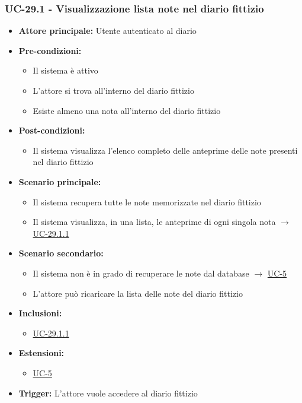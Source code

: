 \documentclass[a4paper,12pt]{article}
\begin{document}
\subsubsection{UC-29.1 - Visualizzazione lista note nel diario fittizio} \label{subsec:UC-29.1}
\begin{itemize}
    \item \textbf{Attore principale:} Utente autenticato al diario
    \item \textbf{Pre-condizioni:}
    \begin{itemize}
        \item Il sistema è attivo
        \item L'attore si trova all'interno del diario fittizio
        \item Esiste almeno una nota all'interno del diario fittizio
    \end{itemize}
    \item \textbf{Post-condizioni:} 
    \begin{itemize}
        \item Il sistema visualizza l'elenco completo delle anteprime delle note presenti nel diario fittizio
    \end{itemize}
    \item \textbf{Scenario principale:} 
    \begin{itemize}
        \item Il sistema recupera tutte le note memorizzate nel diario fittizio
        \item Il sistema visualizza, in una lista, le anteprime di ogni singola nota $\rightarrow$ \hyperref[subsec:UC-29.1.1]{UC-29.1.1}
    \end{itemize}
    \item \textbf{Scenario secondario:} 
    \begin{itemize}
        \item Il sistema non è in grado di recuperare le note dal database $\rightarrow$ \hyperref[sec:UC-5]{UC-5}
        \item L'attore può ricaricare la lista delle note del diario fittizio
    \end{itemize}
    \item \textbf{Inclusioni:}
    \begin{itemize}
        \item \hyperref[subsec:UC-29.1.1]{UC-29.1.1}
    \end{itemize}
    \item \textbf{Estensioni:}
    \begin{itemize}
        \item \hyperref[sec:UC-5]{UC-5}
    \end{itemize}
    \item \textbf{Trigger:} L'attore vuole accedere al diario fittizio
\end{itemize}
\end{document}
